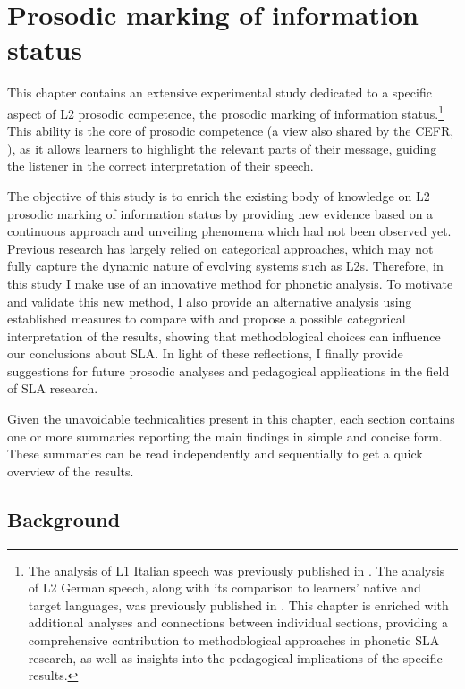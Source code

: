 \chapter{Prosodic marking of information status}
\graphicspath{{figures/plots-chapter-2}}
\label{chap:2}
This chapter contains an extensive experimental study dedicated to a specific aspect of L2 prosodic competence, the prosodic marking of information status.\footnote{The analysis of L1 Italian speech was previously published in \citet{SbrannaEtAl2023}. The analysis of L2 German speech, along with its comparison to learners’ native and target languages, was previously published in \citet{SbrannaEtAl2025}. This chapter is enriched with additional analyses and connections between individual sections, providing a comprehensive contribution to methodological approaches in phonetic SLA research, as well as insights into the pedagogical implications of the specific results.} This ability is the core of prosodic competence (a view also shared by the CEFR, \citealt{CouncilofEurope2020}), as it allows learners to highlight the relevant parts of their message, guiding the listener in the correct interpretation of their speech.

The objective of this study is to enrich the existing body of knowledge on L2 prosodic marking of information status by providing new evidence based on a continuous approach and unveiling phenomena which had not been observed yet. Previous research has largely relied on categorical approaches, which may not fully capture the dynamic nature of evolving systems such as L2s. Therefore, in this study I make use of an innovative method for phonetic analysis. To motivate and validate this new method, I also provide an alternative analysis using established measures to compare with and propose a possible categorical interpretation of the results, showing that methodological choices can influence our conclusions about SLA. In light of these reflections, I finally provide suggestions for future prosodic analyses and pedagogical applications in the field of SLA research.

Given the unavoidable technicalities present in this chapter, each section contains one or more summaries reporting the main findings in simple and concise form. These summaries can be read independently and sequentially to get a quick overview of the results.

\section{Background}
\label{sec:2.1}
